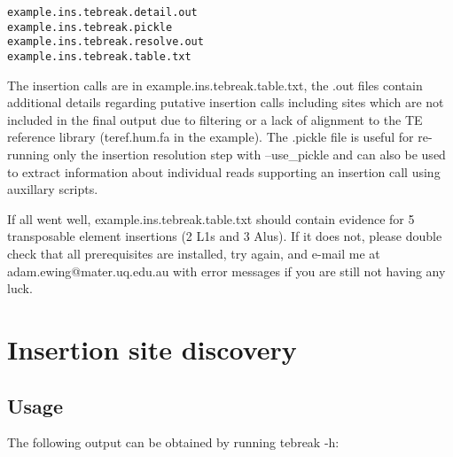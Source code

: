 \documentclass[letterpaper,11pt]{article}
\begin{document}
\begin{verbatim}
example.ins.tebreak.detail.out
example.ins.tebreak.pickle
example.ins.tebreak.resolve.out
example.ins.tebreak.table.txt
\end{verbatim}

The insertion calls are in example.ins.tebreak.table.txt, the .out files contain additional details regarding putative insertion calls including sites which are not included in the final output due to filtering or a lack of alignment to the TE reference library (teref.hum.fa in the example). The .pickle file is useful for re-running only the insertion resolution step with --use\_pickle and can also be used to extract information about individual reads supporting an insertion call using auxillary scripts.

If all went well, example.ins.tebreak.table.txt should contain evidence for 5 transposable element insertions (2 L1s and 3 Alus). If it does not, please double check that all prerequisites are installed, try again, and e-mail me at adam.ewing@mater.uq.edu.au with error messages if you are still not having any luck.


\section{Insertion site discovery}
\subsection{Usage}

The following output can be obtained by running tebreak -h:
\end{document}
